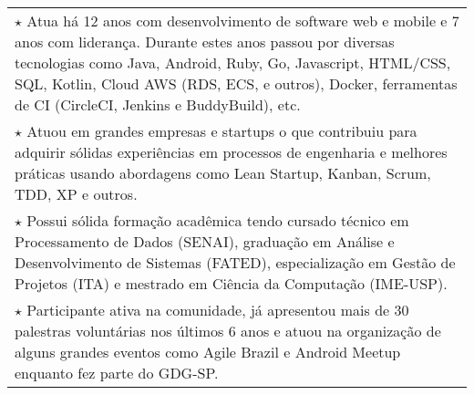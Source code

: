 \documentclass[a4paper, oneside, final]{scrartcl}
\newcommand{\vspc}{\vspace{0.15cm}} %
\begin{document}
\begin{center}
\begin{tabularx}{1\linewidth}{X}




  $\star$ Atua há 12 anos com desenvolvimento de software web e mobile e 7 anos com liderança. Durante estes anos passou por diversas tecnologias como Java, Android, Ruby, Go, Javascript, HTML/CSS, SQL, Kotlin, Cloud AWS (RDS, ECS, e outros), Docker, ferramentas de CI (CircleCI, Jenkins e BuddyBuild), etc.  \vspc \\

  $\star$ Atuou em grandes empresas e startups o que contribuiu para adquirir sólidas experiências em processos de engenharia e melhores práticas usando abordagens como Lean Startup, Kanban, Scrum, TDD, XP e outros. \vspc \\

  $\star$ Possui sólida formação acadêmica tendo cursado técnico em Processamento de Dados (SENAI), graduação em Análise e Desenvolvimento de Sistemas (FATED), especialização em Gestão de Projetos (ITA) e mestrado em Ciência da Computação (IME-USP). \vspc \\

  $\star$ Participante ativa na comunidade, já apresentou mais de 30 palestras voluntárias nos últimos 6 anos e atuou na organização de alguns grandes eventos como Agile Brazil e Android Meetup enquanto fez parte do GDG-SP.
\end{tabularx}

  

\end{center}
\end{document}
